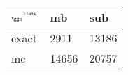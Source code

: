 \begin{tabular}{lll}
    \toprule
    $_{\text{\tiny{\ggn}}}$$^{\text{\tiny{Data}}}$ & mb & sub \\
    \midrule
    exact & 2911
              & 13186 \\
    mc   & 14656
              & 20757 \\
    \bottomrule
\end{tabular}